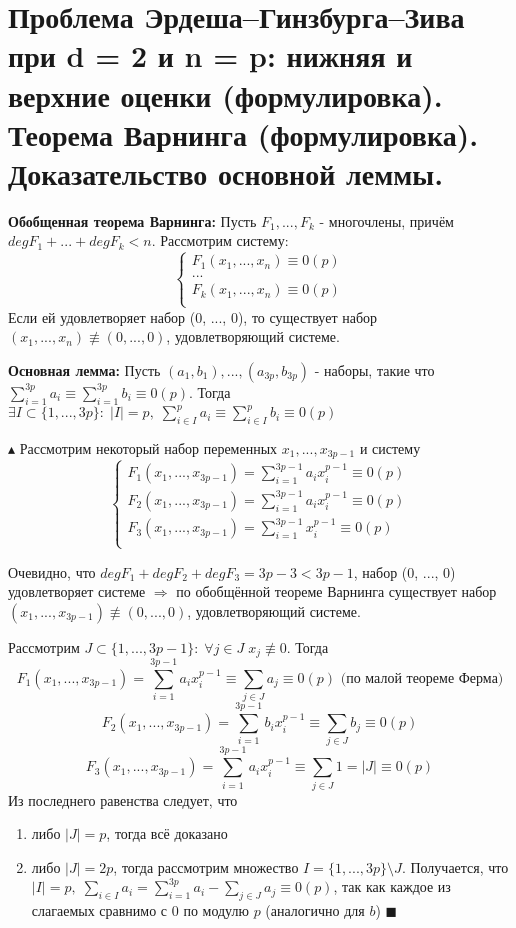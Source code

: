 \section{Проблема Эрдеша–Гинзбурга–Зива при d = 2 и n = p: нижняя и верхние оценки (формулировка). Теорема Варнинга (формулировка). Доказательство основной леммы.}
\par \textbf{Обобщенная теорема Варнинга: } Пусть $F_1, ..., F_k$ - многочлены, причём $deg F_1 +...+deg F_k < n$. Рассмотрим систему:
$$\left\{
\begin{array}{ccc}
F_1(x_1, ..., x_n) \equiv 0(p)\\
...\\
F_k(x_1, ..., x_n) \equiv 0(p)\\
\end{array}
\right. $$
Если ей удовлетворяет набор (0, ..., 0), то существует набор $(x_1, ..., x_n) \not\equiv (0, ..., 0)$, удовлетворяющий системе.
\par \textbf{Основная лемма: } Пусть $(a_1, b_1), ..., (a_{3p}, b_{3p})$ - наборы, такие что $\sum\limits_{i=1}^{3p}a_i \equiv \sum\limits_{i=1}^{3p}b_i \equiv 0(p)$. Тогда $\exists I \subset \{1, ..., 3p\}: \; |I|=p, \; \sum\limits_{i \in I}^{p}a_i \equiv \sum\limits_{i \in I}^{p}b_i \equiv 0 (p)$
\par $\blacktriangle$ Рассмотрим некоторый набор переменных $x_1, ..., x_{3p-1}$ и систему
$$\left\{
\begin{array}{ccc}
F_1(x_1, ..., x_{3p-1}) =\sum\limits_{i=1}^{3p-1}a_i x_i^{p-1} \equiv 0(p)\\
F_2(x_1, ..., x_{3p-1}) =\sum\limits_{i=1}^{3p-1}a_i x_i^{p-1} \equiv 0(p)\\
F_3(x_1, ..., x_{3p-1}) =\sum\limits_{i=1}^{3p-1}x_i^{p-1} \equiv 0(p)\\
\end{array}
\right. $$
\par Очевидно, что $deg F_1 + deg F_2 + deg F_3 = 3p - 3 < 3p-1$, набор (0, ..., 0) удовлетворяет системе $\Rightarrow$ по обобщённой теореме Варнинга существует набор $(x_1, ..., x_{3p-1}) \not\equiv (0, ..., 0)$, удовлетворяющий системе.
\par Рассмотрим $J \subset \{1, ..., 3p-1\}: \; \forall j \in J \; x_j \not\equiv 0$. Тогда
$$F_1(x_1, ..., x_{3p-1})=\sum_{i=1}^{3p-1}a_i x_i^{p-1} \equiv \sum_{j \in J}a_j \equiv 0(p) \mbox{ (по малой теореме Ферма)}$$
$$F_2(x_1, ..., x_{3p-1})=\sum_{i=1}^{3p-1}b_i x_i^{p-1} \equiv \sum_{j \in J}b_j \equiv 0(p)$$
$$F_3(x_1, ..., x_{3p-1})=\sum_{i=1}^{3p-1}a_i x_i^{p-1} \equiv \sum_{j \in J}1 = |J| \equiv 0(p)$$
Из последнего равенства следует, что 
\begin{enumerate}
    \item либо $|J|=p$, тогда всё доказано
    \item либо $|J|=2p$, тогда рассмотрим множество $I=\{1, ..., 3p\} \setminus J$. Получается, что $|I|=p, \; \sum\limits_{i \in I} a_i = \sum\limits_{i=1}^{3p}a_i-\sum\limits_{j \in J} a_j \equiv 0(p)$, так как каждое из слагаемых сравнимо с 0 по модулю $p$ (аналогично для $b$) $\blacksquare$
\end{enumerate}

